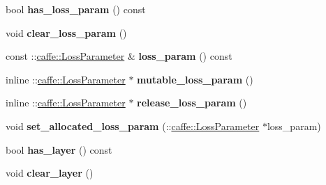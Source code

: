 \begin{DoxyCompactItemize}
\item 
\mbox{\label{classcaffe_1_1_v1_layer_parameter_a9033767eefb4abd9dd6bf70216cc3368}} 
bool {\bfseries has\+\_\+loss\+\_\+param} () const
\item 
\mbox{\label{classcaffe_1_1_v1_layer_parameter_a8686e9ec87a957da48f19984b140a73a}} 
void {\bfseries clear\+\_\+loss\+\_\+param} ()
\item 
\mbox{\label{classcaffe_1_1_v1_layer_parameter_a27397c37b8ea4a9089cdfc543c39cc33}} 
const \+::\mbox{\hyperlink{classcaffe_1_1_loss_parameter}{caffe\+::\+Loss\+Parameter}} \& {\bfseries loss\+\_\+param} () const
\item 
\mbox{\label{classcaffe_1_1_v1_layer_parameter_afe89a3f0d71e8155d3b4e1b85d175f2b}} 
inline \+::\mbox{\hyperlink{classcaffe_1_1_loss_parameter}{caffe\+::\+Loss\+Parameter}} $\ast$ {\bfseries mutable\+\_\+loss\+\_\+param} ()
\item 
\mbox{\label{classcaffe_1_1_v1_layer_parameter_ac1b97d5266fb2d494a93d6b1c5631002}} 
inline \+::\mbox{\hyperlink{classcaffe_1_1_loss_parameter}{caffe\+::\+Loss\+Parameter}} $\ast$ {\bfseries release\+\_\+loss\+\_\+param} ()
\item 
\mbox{\label{classcaffe_1_1_v1_layer_parameter_a044fa4aedf5344ee0c1739c11889f697}} 
void {\bfseries set\+\_\+allocated\+\_\+loss\+\_\+param} (\+::\mbox{\hyperlink{classcaffe_1_1_loss_parameter}{caffe\+::\+Loss\+Parameter}} $\ast$loss\+\_\+param)
\item 
\mbox{\label{classcaffe_1_1_v1_layer_parameter_a915ffd74ce27cc2e1256eff93a9c3026}} 
bool {\bfseries has\+\_\+layer} () const
\item 
\mbox{\label{classcaffe_1_1_v1_layer_parameter_adeee0a04259bda344e9c7f94a13c5c40}} 
void {\bfseries clear\+\_\+layer} ()
\item 
\mbox{\label{classcaffe_1_1_v1_layer_parameter_a9a1a05d66b9c97bb3a4d9f450e5ad74d}} 

\end{DoxyCompactItemize}
